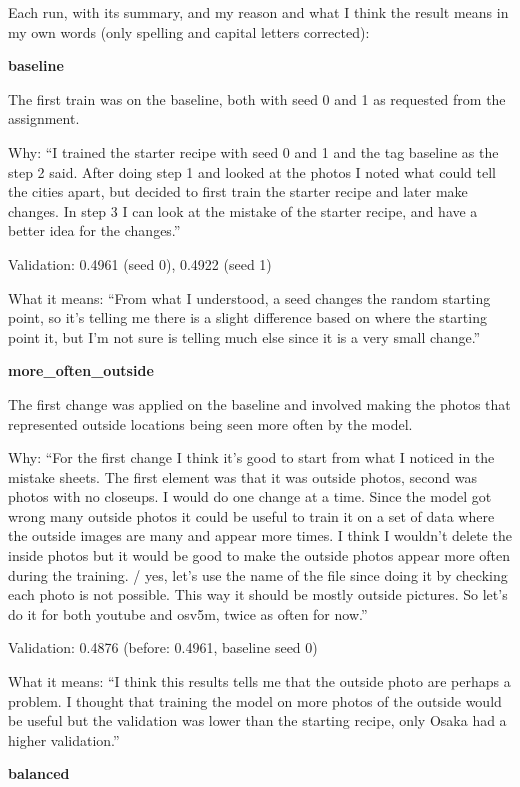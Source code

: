 \documentclass[11pt]{article}
\begin{document}
Each run, with its summary, and my reason and what I think the result means in my own words (only spelling and capital letters corrected):
{\small
\par\medskip\noindent\textbf{baseline}\par
The first train was on the baseline, both with seed 0 and 1 as requested from the assignment.\par
Why: ``I trained the starter recipe with seed 0 and 1 and the tag baseline as the step 2 said. After doing step 1 and looked at the photos I noted what could tell the cities apart, but decided to first train the starter recipe and later make changes. In step 3 I can look at the mistake of the starter recipe, and have a better idea for the changes.''\par
Validation: 0.4961 (seed 0), 0.4922 (seed 1)\par
What it means: ``From what I understood, a seed changes the random starting point, so it's telling me there is a slight difference based on where the starting point it, but I'm not sure is telling much else since it is a very small change.''
\par\medskip\noindent\textbf{more\_often\_outside}\par
The first change was applied on the baseline and involved making the photos that represented outside locations being seen more often by the model.\par
Why: ``For the first change I think it's good to start from what I noticed in the mistake sheets. The first element was that it was outside photos, second was photos with no closeups. I would do one change at a time. Since the model got wrong many outside photos it could be useful to train it on a set of data where the outside images are many and appear more times. I think I wouldn't delete the inside photos but it would be good to make the outside photos appear more often during the training. / yes, let's use the name of the file since doing it by checking each photo is not possible. This way it should be mostly outside pictures. So let's do it for both youtube and osv5m, twice as often for now.''\par
Validation: 0.4876 (before: 0.4961, baseline seed 0)\par
What it means: ``I think this results tells me that the outside photo are perhaps a problem. I thought that training the model on more photos of the outside would be useful but the validation was lower than the starting recipe, only Osaka had a higher validation.''
\par\medskip\noindent\textbf{balanced}\par
}
\end{document}
